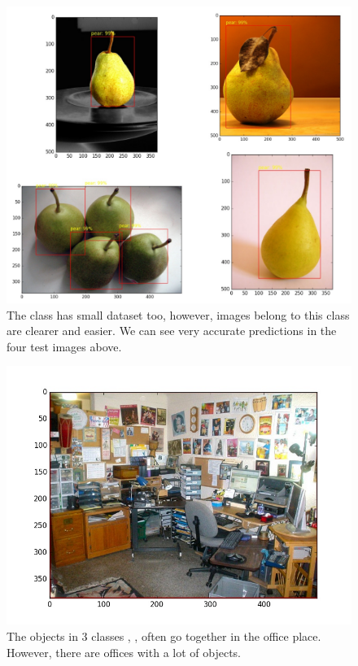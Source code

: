 \begin{figure}[tb]
	\centering
	\includegraphics[width=1.0\hsize]{./figures/pear}
	\caption{The class  has small dataset too, however, images belong to this class are clearer and easier. We can see very accurate predictions in the four test images above.}
	\label{fig:pear}
\end{figure}

\begin{figure}[tb]
	\centering
	\includegraphics[width=0.8\hsize]{./figures/messyOffice}
	\caption{The objects in 3 classes , ,  often go together in the office place. However, there are offices with a lot of objects.}
	\label{fig:messyOffice}
\end{figure}

